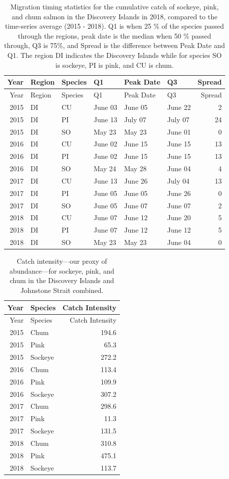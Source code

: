 \documentclass[fleqn,10pt]{wlpeerj} %
\begin{document}
\begin{longtable}[]{@{}rlllllr@{}}
\caption{\label{tab:migration-timing-table} Migration timing statistics for the cumulative catch of sockeye, pink, and chum salmon in the Discovery Islands in 2018, compared to the time-series average (2015 - 2018). Q1 is when 25 \% of the species passed through the regions, peak date is the median when 50 \% passed through, Q3 is 75\%, and Spread is the difference between Peak Date and Q1. The region DI indicates the Discovery Islands while for species SO is sockeye, PI is pink, and CU is chum.}\tabularnewline
\toprule
Year & Region & Species & Q1 & Peak Date & Q3 & Spread\tabularnewline
\midrule
\endfirsthead
\toprule
Year & Region & Species & Q1 & Peak Date & Q3 & Spread\tabularnewline
\midrule
\endhead
2015 & DI & CU & June 03 & June 05 & June 22 & 2\tabularnewline
2015 & DI & PI & June 13 & July 07 & July 07 & 24\tabularnewline
2015 & DI & SO & May 23 & May 23 & June 01 & 0\tabularnewline
2016 & DI & CU & June 02 & June 15 & June 15 & 13\tabularnewline
2016 & DI & PI & June 02 & June 15 & June 15 & 13\tabularnewline
2016 & DI & SO & May 24 & May 28 & June 04 & 4\tabularnewline
2017 & DI & CU & June 13 & June 26 & July 04 & 13\tabularnewline
2017 & DI & PI & June 05 & June 05 & June 26 & 0\tabularnewline
2017 & DI & SO & June 05 & June 07 & June 07 & 2\tabularnewline
2018 & DI & CU & June 07 & June 12 & June 20 & 5\tabularnewline
2018 & DI & PI & June 07 & June 12 & June 12 & 5\tabularnewline
2018 & DI & SO & May 23 & May 23 & June 04 & 0\tabularnewline
\bottomrule
\end{longtable}

\begin{longtable}[]{@{}rlr@{}}
\caption{\label{tab:catch-intensity-table} Catch intensity---our proxy of abundance---for sockeye, pink, and chum in the Discovery Islands and Johnstone Strait combined.}\tabularnewline
\toprule
Year & Species & Catch Intensity\tabularnewline
\midrule
\endfirsthead
\toprule
Year & Species & Catch Intensity\tabularnewline
\midrule
\endhead
2015 & Chum & 194.6\tabularnewline
2015 & Pink & 65.3\tabularnewline
2015 & Sockeye & 272.2\tabularnewline
2016 & Chum & 113.4\tabularnewline
2016 & Pink & 109.9\tabularnewline
2016 & Sockeye & 307.2\tabularnewline
2017 & Chum & 298.6\tabularnewline
2017 & Pink & 11.3\tabularnewline
2017 & Sockeye & 131.5\tabularnewline
2018 & Chum & 310.8\tabularnewline
2018 & Pink & 475.1\tabularnewline
2018 & Sockeye & 113.7\tabularnewline
\bottomrule
\end{longtable}
\end{document}
